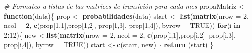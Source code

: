 \documentclass[]{article}
\newenvironment{Shaded}{\begin{snugshade}}{\end{snugshade}}
\newcommand{\CommentTok}[1]{\textcolor[rgb]{0.56,0.35,0.01}{\textit{#1}}}
\newcommand{\ControlFlowTok}[1]{\textcolor[rgb]{0.13,0.29,0.53}{\textbf{#1}}}
\newcommand{\DataTypeTok}[1]{\textcolor[rgb]{0.13,0.29,0.53}{#1}}
\newcommand{\DecValTok}[1]{\textcolor[rgb]{0.00,0.00,0.81}{#1}}
\newcommand{\KeywordTok}[1]{\textcolor[rgb]{0.13,0.29,0.53}{\textbf{#1}}}
\newcommand{\NormalTok}[1]{#1}
\newcommand{\OperatorTok}[1]{\textcolor[rgb]{0.81,0.36,0.00}{\textbf{#1}}}
\newcommand{\OtherTok}[1]{\textcolor[rgb]{0.56,0.35,0.01}{#1}}
\newcommand{\StringTok}[1]{\textcolor[rgb]{0.31,0.60,0.02}{#1}}
\begin{document}
\begin{Shaded}
\begin{Highlighting}[]
\CommentTok{# Formateo a listas de las matrices de transición para cada mes}
\NormalTok{propaMatriz <-}\StringTok{ }\ControlFlowTok{function}\NormalTok{(data)\{}
\NormalTok{  prop <-}\StringTok{ }\KeywordTok{probabilidades}\NormalTok{(data)}
\NormalTok{  start <-}\StringTok{ }\KeywordTok{list}\NormalTok{(}\KeywordTok{matrix}\NormalTok{(}\DataTypeTok{nrow =} \DecValTok{2}\NormalTok{, }\DataTypeTok{ncol =} \DecValTok{2}\NormalTok{, }\KeywordTok{c}\NormalTok{(prop[}\DecValTok{1}\NormalTok{,}\DecValTok{1}\NormalTok{],prop[}\DecValTok{1}\NormalTok{,}\DecValTok{2}\NormalTok{],}
\NormalTok{                                             prop[}\DecValTok{1}\NormalTok{,}\DecValTok{3}\NormalTok{], prop[}\DecValTok{1}\NormalTok{,}\DecValTok{4}\NormalTok{]), }\DataTypeTok{byrow =} \OtherTok{TRUE}\NormalTok{))}
  \ControlFlowTok{for}\NormalTok{(i }\ControlFlowTok{in} \DecValTok{2}\OperatorTok{:}\DecValTok{12}\NormalTok{)\{}
\NormalTok{    new <-}\KeywordTok{list}\NormalTok{(}\KeywordTok{matrix}\NormalTok{(}\DataTypeTok{nrow =} \DecValTok{2}\NormalTok{, }\DataTypeTok{ncol =} \DecValTok{2}\NormalTok{, }\KeywordTok{c}\NormalTok{(prop[i,}\DecValTok{1}\NormalTok{],prop[i,}\DecValTok{2}\NormalTok{],}
\NormalTok{                                            prop[i,}\DecValTok{3}\NormalTok{], prop[i,}\DecValTok{4}\NormalTok{]), }\DataTypeTok{byrow =} \OtherTok{TRUE}\NormalTok{))}
\NormalTok{    start <-}\StringTok{ }\KeywordTok{c}\NormalTok{(start, new)}
\NormalTok{  \}}
  \KeywordTok{return}\NormalTok{ (start)}
\NormalTok{\}}
\end{Highlighting}
\end{Shaded}

\begin{Shaded}
\end{Shaded}
\end{document}
